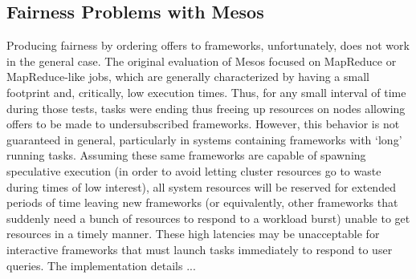 \subsection{Fairness Problems with Mesos}
Producing fairness by ordering offers to frameworks, unfortunately, does not work in the general case. The original evaluation of Mesos focused on MapReduce or MapReduce-like jobs, which are generally characterized by having a small footprint and, critically, low execution times. Thus, for any small interval of time during those tests, tasks were ending thus freeing up resources on nodes allowing offers to be made to undersubscribed frameworks. However, this behavior is not guaranteed in general, particularly in systems containing frameworks with `long' running tasks. Assuming these same frameworks are capable of spawning speculative execution (in order to avoid letting cluster resources go to waste during times of low interest), all system resources will be reserved for extended periods of time leaving new frameworks (or equivalently, other frameworks that suddenly need a bunch of resources to respond to a workload burst) unable to get resources in a timely manner. These high latencies may be unacceptable for interactive frameworks that must launch tasks immediately to respond to user queries. The implementation details ...

